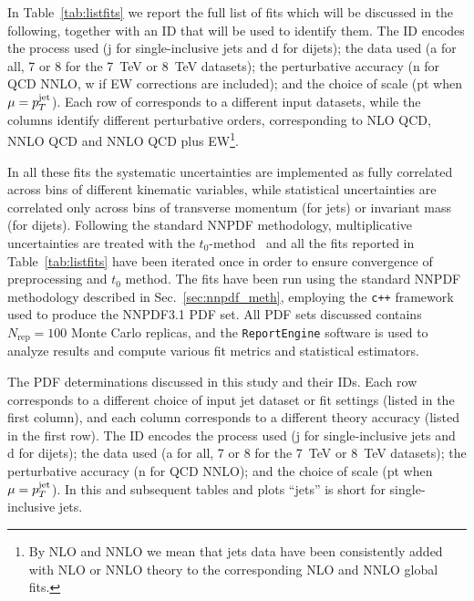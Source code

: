 %
In Table~\ref{tab:listfits} we report the full list of fits which will be discussed in the following, together 
with an ID that will be used to identify them.
The ID encodes the process used (j for single-inclusive
jets and d for dijets); the data used (a for all, 7 or 8 for the
7~TeV or 8~TeV datasets); the perturbative accuracy (n for QCD NNLO, w if EW corrections are included);
and the choice of scale (pt when $\mu=p_T^{\rm jet}$).
%
Each row of corresponds to a different input datasets, while the columns identify different perturbative orders,
corresponding to NLO QCD, NNLO QCD and NNLO QCD plus EW\footnote{By NLO and NNLO we mean that jets data have been
consistently added with NLO or NNLO theory to the corresponding NLO and NNLO global fits.}.

%
In all these fits the systematic uncertainties are implemented as fully correlated across bins of different kinematic 
variables, while statistical uncertainties are correlated only across bins of transverse momentum (for jets) or 
invariant mass (for dijets). Following the standard NNPDF methodology, multiplicative uncertainties are 
treated with the $t_0$-method~\cite{Ball:2009qv} and all the fits reported in Table~\ref{tab:listfits} have been iterated once
in order to ensure convergence of preprocessing and $t_0$ method.
The fits have been run using the standard NNPDF methodology described in Sec.~\ref{sec:nnpdf_meth}, employing
the {\tt c++} framework used to produce the NNPDF3.1 PDF set.
All PDF sets discussed contains $N_{\text{rep}}=100$ Monte Carlo replicas, 
and the {\tt ReportEngine} software \cite{zahari_kassabov_2019_2571601} is used 
to analyze results and compute various fit metrics and statistical estimators.  
\begin{table}[!t]
    \renewcommand*{\arraystretch}{1.60}
    \scriptsize
    \centering
    
    \vspace{0.3cm}
    \caption{The PDF determinations discussed in this study and their
      IDs. Each row corresponds to a different choice of input jet dataset or fit
      settings (listed in the first column), and each column corresponds
      to a different theory accuracy (listed in the first row).
      The ID encodes the process used (j for single-inclusive
      jets and d for dijets); the data used (a for all, 7 or 8 for the
      7~TeV or 8~TeV datasets); the perturbative accuracy (n for QCD NNLO); and the choice of scale (pt when
      $\mu=p_T^{\rm jet}$).
      In this and subsequent tables and plots
      ``jets'' is short for single-inclusive jets.}
    \label{tab:listfits}
\end{table}

